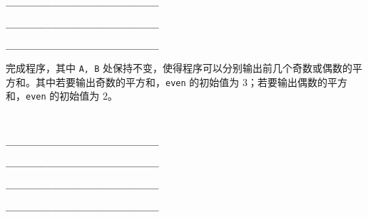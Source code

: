 \begin{problems}
{\begin{compactenum}[A：]
            \item \verb|______________________________|
            \item \verb|______________________________|
            \item \verb|______________________________|
        \end{compactenum}}
        \qn 完成程序，其中 \verb|A, B| 处保持不变，使得程序可以分别输出前几个奇数或偶数的平方和。其中若要输出奇数的平方和，\verb|even| 的初始值为 3；若要输出偶数的平方和，\verb|even| 的初始值为 2。
        {\tt
        \begin{compactenum}[A：]
            \item \verb|______________________________|
            \item \verb|______________________________|
            \item \verb|______________________________|
            \item \verb|______________________________|
        \end{compactenum}}
    \end{problems}